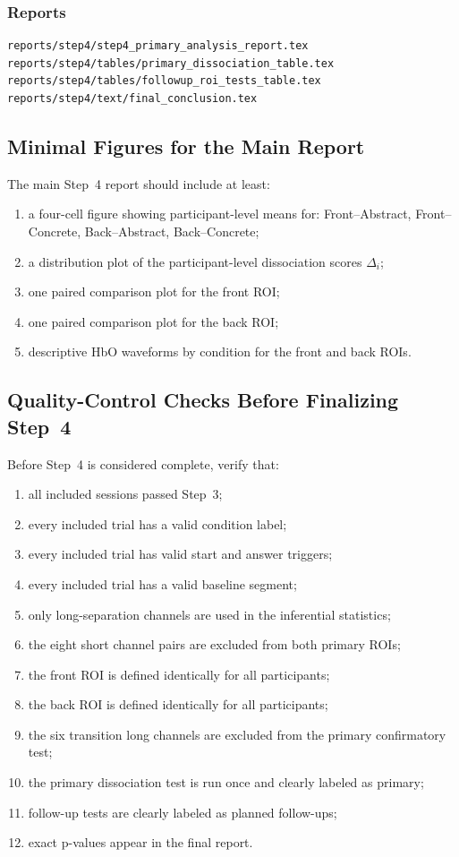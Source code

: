 \documentclass[11pt]{article}
\begin{document}
\subsubsection*{Reports}
\begin{verbatim}
reports/step4/step4_primary_analysis_report.tex
reports/step4/tables/primary_dissociation_table.tex
reports/step4/tables/followup_roi_tests_table.tex
reports/step4/text/final_conclusion.tex
\end{verbatim}

\subsection{Minimal Figures for the Main Report}
The main Step~4 report should include at least:
\begin{enumerate}
    \item a four-cell figure showing participant-level means for:
    Front--Abstract, Front--Concrete, Back--Abstract, Back--Concrete;
    \item a distribution plot of the participant-level dissociation scores \(\Delta_i\);
    \item one paired comparison plot for the front ROI;
    \item one paired comparison plot for the back ROI;
    \item descriptive HbO waveforms by condition for the front and back ROIs.
\end{enumerate}

\subsection{Quality-Control Checks Before Finalizing Step~4}
Before Step~4 is considered complete, verify that:
\begin{enumerate}
    \item all included sessions passed Step~3;
    \item every included trial has a valid condition label;
    \item every included trial has valid start and answer triggers;
    \item every included trial has a valid baseline segment;
    \item only long-separation channels are used in the inferential statistics;
    \item the eight short channel pairs are excluded from both primary ROIs;
    \item the front ROI is defined identically for all participants;
    \item the back ROI is defined identically for all participants;
    \item the six transition long channels are excluded from the primary confirmatory test;
    \item the primary dissociation test is run once and clearly labeled as primary;
    \item follow-up tests are clearly labeled as planned follow-ups;
    \item exact p-values appear in the final report.
\end{enumerate}
\end{document}
